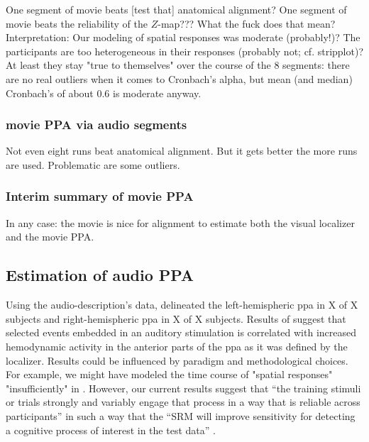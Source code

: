 One segment of movie beats [test that] anatomical alignment?
%
One segment of movie beats the reliability of the $Z$-map??? What the fuck does
that mean?
%
Interpretation:
%
Our modeling of spatial responses was moderate (probably!)? The participants
are too heterogeneous in their responses (probably not; cf.  stripplot)?
%
At least they stay "true to themselves" over the course of the 8 segments:
%
there are no real outliers when it comes to Cronbach's alpha, but mean (and
median) Cronbach's of about 0.6 is moderate anyway.


\subsubsection{movie PPA via audio segments}

Not even eight runs beat anatomical alignment.
%
But it gets better the more runs
are used. Problematic are some outliers.


\subsubsection{Interim summary of movie PPA}

In any case: the movie is nice for alignment to estimate both the visual
localizer and the movie PPA.



\subsection{Estimation of audio PPA}




Using the audio-description's data, \citet{haeusler2022processing} delineated
the left-hemispheric \ac{ppa} in X of X subjects and right-hemispheric \ac{ppa}
in X of X subjects.
%
Results of \citet{haeusler2022processing} suggest that selected events embedded
in an auditory stimulation is correlated with increased hemodynamic activity in
the anterior parts of the \ac{ppa} as it was defined by the localizer.
%
Results could be influenced by paradigm and methodological choices.
%
For example, we might have modeled the time course of "spatial responses"
"insufficiently" in \citep{haeusler2022processing}.
%
However, our current results suggest that ``the training stimuli or trials
strongly and variably engage that process in a way that is reliable across
participants'' in such a way that the ``SRM will improve sensitivity for
detecting a cognitive process of interest in the test data''
\citep{cohen2017computational}.


